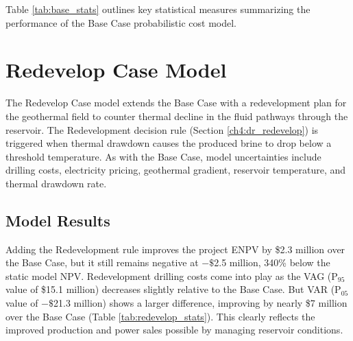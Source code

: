 Table \ref{tab:base_stats} outlines key statistical measures summarizing the performance of the Base Case probabilistic cost model.
\begin{table}[H]
\centering
{}
\caption[Probabilistic Base Case statistics]{Base case probabilistic model statistics for 2000 model realizations. NPV is reported in \$M, where M is million. NPV$_s$ refers to the static model NPV reported in Section \ref{ch6:static_stats}.}
\label{tab:base_stats}
\end{table}

\section{Redevelop Case Model}
\label{ch6:redevelop_case}

The Redevelop Case model extends the Base Case with a redevelopment plan for the geothermal field to counter thermal decline in the fluid pathways through the reservoir. The Redevelopment decision rule (Section \ref{ch4:dr_redevelop}) is triggered when thermal drawdown causes the produced brine to drop below a threshold temperature. As with the Base Case, model uncertainties include drilling costs, electricity pricing, geothermal gradient, reservoir temperature, and thermal drawdown rate.

\subsection{Model Results}\label{ch6:redevelop_results}

Adding the Redevelopment rule improves the project ENPV by \$2.3 million over the Base Case, but it still remains negative at $-\$$2.5 million, 340\% below the static model NPV. Redevelopment drilling costs come into play as the VAG (P$_{95}$ value of \$15.1 million) decreases slightly relative to the Base Case. But VAR (P$_{05}$ value of $-\$$21.3 million) shows a larger difference, improving by nearly \$7 million over the Base Case (Table \ref{tab:redevelop_stats}). This clearly reflects the improved production and power sales possible by managing reservoir conditions.

